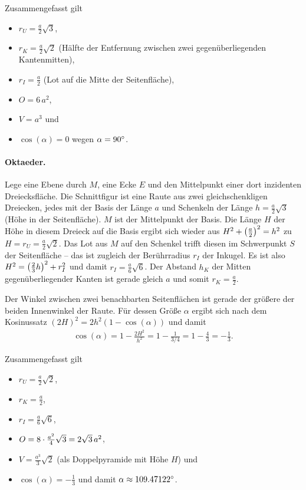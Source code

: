 \documentclass[11pt]{article}
\begin{document}
Zusammengefasst gilt
\begin{itemize}
\item $r_U=\frac{a}{2}\sqrt{3}$, 
\item $r_K=\frac{a}{2}\sqrt{2}$ (Hälfte der Entfernung zwischen zwei
  gegenüberliegenden Kantenmitten),
\item $r_I=\frac{a}{2}$ (Lot auf die Mitte der Seitenfläche),
\item $O=6\,a^2$,
\item $V=a^3$ und
\item $\cos(\alpha)=0$ wegen $\alpha=90^{\circ}$.
\end{itemize}

\paragraph{Oktaeder.}
Lege eine Ebene durch $M$, eine Ecke $E$ und den Mittelpunkt einer dort
inzidenten Dreiecksfläche. Die Schnittfigur ist eine Raute aus zwei
gleichschenkligen Dreiecken, jedes mit der Basis der Länge $a$ und Schenkeln
der Länge $h=\frac{a}{2}\sqrt{3}$ (Höhe in der Seitenfläche). $M$ ist der
Mittelpunkt der Basis. Die Länge $H$ der Höhe in diesem Dreieck auf die Basis
ergibt sich wieder aus $H^2+\left(\frac{a}{2}\right)^2=h^2$ zu
$H=r_U=\frac{a}{2}\sqrt{2}$. Das Lot aus $M$ auf den Schenkel trifft diesen im
Schwerpunkt $S$ der Seitenfläche -- das ist zugleich der Berührradius $r_I$
der Inkugel. Es ist also $H^2=\left(\frac23 h\right)^2+r_I^2$ und damit
$r_I=\frac{a}{6}\sqrt{6}$.  Der Abstand $h_K$ der Mitten gegenüberliegender
Kanten ist gerade gleich $a$ und somit $r_K=\frac{a}{2}$.

Der Winkel zwischen zwei benachbarten Seitenflächen ist gerade der größere der
beiden Innenwinkel der Raute.  Für dessen Größe $\alpha$ ergibt sich nach dem
Kosinussatz $(2H)^2=2h^2(1-\cos(\alpha))$ und damit
\begin{gather*}
  \cos(\alpha)=1-\frac{2H^2}{h^2}=1-\frac{1}{3/4}=1-\frac43=-\frac13.
\end{gather*}
\newpage

Zusammengefasst gilt
\begin{itemize}
\item $r_U=\frac{a}{2}\sqrt{2}$, 
\item $r_K=\frac{a}{2}$,
\item $r_I=\frac{a}{6}\sqrt{6}$,
\item $O=8\cdot\frac{a^2}{4}\sqrt{3}=2\sqrt{3}\,a^2$,
\item $V=\frac{a^3}{3}\sqrt{2}$ (als Doppelpyramide mit Höhe $H$) und
\item $\cos(\alpha)=-\frac13$ und damit $\alpha\approx 109.47122^{\circ}$.
\end{itemize}
\end{document}
